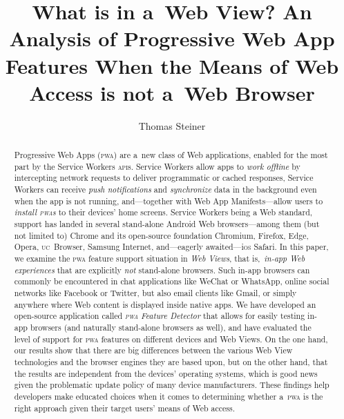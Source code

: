 \documentclass[sigconf]{acmart}
\begin{document}
\title[What is in a~Web View?]{What is in a~Web View?
An Analysis of Progressive Web App Features
When the Means of Web Access is not a~Web Browser}  



\author{Thomas Steiner}



\begin{abstract}
Progressive Web Apps (\textsc{pwa}) are a~new class of Web applications,
enabled for the most part by the Service Workers \textsc{api}s.
Service Workers allow apps to \emph{work offline}
by intercepting network requests to deliver programmatic or cached responses,
Service Workers can receive \emph{push notifications}
and \emph{synchronize} data in the background
even when the app is not running,
and---together with Web App Manifests---allow users to \emph{install \textsc{pwa}s}
to their devices' home screens.
Service Workers being a Web standard, support has landed in several
stand-alone Android Web browsers---among them (but not limited to)
Chrome and its open-source foundation Chromium, Firefox, Edge, Opera,
\textsc{uc}~Browser, Samsung Internet, and---eagerly awaited---i\textsc{os} Safari.
In this paper, we examine the \textsc{pwa} feature support situation in \emph{Web Views},
that is,\ \emph{in-app Web experiences} that are explicitly \emph{not} stand-alone browsers.
Such in-app browsers can commonly be encountered in chat applications like WeChat or WhatsApp,
online social networks like Facebook or Twitter, but also email clients like Gmail,
or simply anywhere where Web content is displayed inside native apps.
We have developed an open-source application called \emph{\textsc{pwa} Feature Detector}
that allows for easily testing in-app browsers (and naturally stand-alone browsers as well),
and have evaluated the level of support for \textsc{pwa} features
on different devices and Web Views.
On the one hand, our results show that there are big differences
between the various Web View technologies
and the browser engines they are based upon,
but on the other hand, that the results
are independent from the devices' operating systems,
which is good news given the problematic update policy of many device manufacturers.
These findings help developers make educated choices when it comes to determining
whether a~\textsc{pwa} is the right approach given their target users' means of Web access.
\end{abstract}
\end{document}
